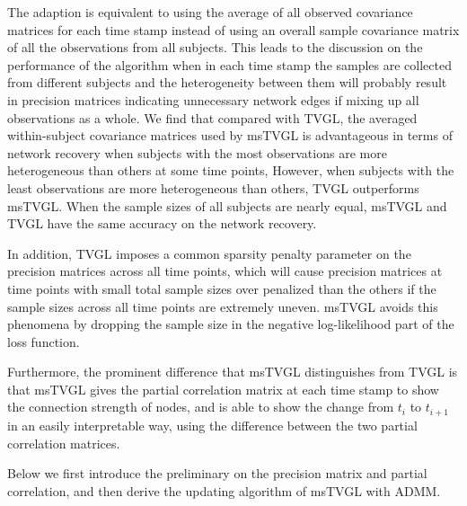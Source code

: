 The adaption is equivalent to using the average of all observed covariance matrices for each time stamp instead of using an overall sample covariance matrix of all the observations from all subjects.
This leads to the discussion on the performance of the algorithm when in each time stamp the samples are collected from different subjects 
and the heterogeneity between them will probably result in precision matrices indicating unnecessary network edges if mixing up all observations as a whole. 
We find that compared with TVGL, the averaged within-subject covariance matrices used by msTVGL 
is advantageous in terms of network recovery when subjects with the most observations are more heterogeneous than others at some time points, 
However, when subjects with the least observations are more heterogeneous than others, 
TVGL outperforms msTVGL. 
When the sample sizes of all subjects are nearly equal, 
msTVGL and TVGL have the same accuracy on the network recovery.


In addition, TVGL imposes a common sparsity penalty parameter on the precision matrices across all time points, 
which will cause precision matrices at time points with small total sample sizes over penalized than the others 
if the sample sizes across all time points are extremely uneven. 
msTVGL avoids this phenomena
by dropping the sample size in the negative log-likelihood part of the loss function. 

Furthermore, the prominent difference that msTVGL distinguishes from TVGL is that 
msTVGL gives the partial correlation matrix at each time stamp to show the connection strength of nodes, 
and is able to show the change from $t_i$ to $t_{i+1}$ in an easily interpretable way,
using the difference between the two partial correlation matrices. 

Below we first introduce the preliminary on the precision matrix and partial correlation, 
and then derive the updating algorithm of msTVGL with ADMM.